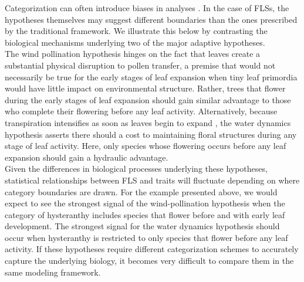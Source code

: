 \documentclass{article}
\begin{document}
\noindent Categorization can often introduce biases in analyses \citep{Naggara2011,Royston2006}. In the case of FLSs, the hypotheses themselves may suggest different boundaries than the ones prescribed by the traditional framework. We illustrate this below by contrasting the biological mechanisms underlying two of the major adaptive hypotheses.\\

\noindent The wind pollination hypothesis hinges on the fact that leaves create a substantial physical disruption to pollen transfer, a premise that would not necessarily be true for the early stages of leaf expansion when tiny leaf primordia would have little impact on environmental structure. Rather, trees that flower during the early stages of leaf expansion should gain similar advantage to those who complete their flowering before any leaf activity. Alternatively, because transpiration intensifies as soon as leaves begin to expand \citep{Breda1996,Wang2018}, the water dynamics hypothesis asserts there should a cost to maintaining floral structures during any stage of leaf activity. Here, only species whose flowering occurs before any leaf expansion should gain a hydraulic advantage.\\ 

\noindent Given the differences in biological processes underlying these hypotheses, statistical relationships between FLS and traits will fluctuate depending on where category boundaries are drawn. For the example presented above, we would expect to see the strongest signal of the wind-pollination hypothesis when the category of hysteranthy includes species that flower before and with early leaf development. The strongest signal for the water dynamics hypothesis should occur when hysteranthy is restricted to only species that flower before any leaf activity. If these hypotheses require different categorization schemes to accurately capture the underlying biology, it becomes very difficult to compare them in the same modeling framework.\\
\end{document}
